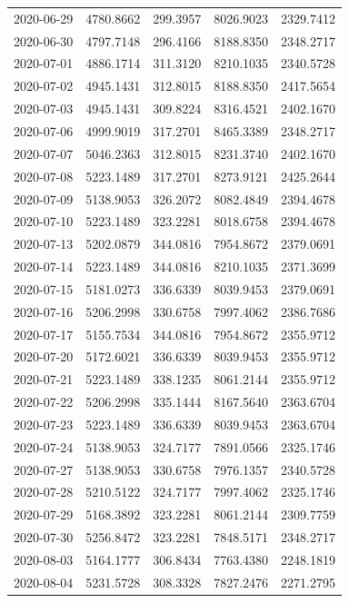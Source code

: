 \begin{footnotesize}
\begin{longtable}{lllll}
2020-06-29 & 4780.8662 & 299.3957 & 8026.9023 & 2329.7412 \\
2020-06-30 & 4797.7148 & 296.4166 & 8188.8350 & 2348.2717 \\
2020-07-01 & 4886.1714 & 311.3120 & 8210.1035 & 2340.5728 \\
2020-07-02 & 4945.1431 & 312.8015 & 8188.8350 & 2417.5654 \\
2020-07-03 & 4945.1431 & 309.8224 & 8316.4521 & 2402.1670 \\
2020-07-06 & 4999.9019 & 317.2701 & 8465.3389 & 2348.2717 \\
2020-07-07 & 5046.2363 & 312.8015 & 8231.3740 & 2402.1670 \\
2020-07-08 & 5223.1489 & 317.2701 & 8273.9121 & 2425.2644 \\
2020-07-09 & 5138.9053 & 326.2072 & 8082.4849 & 2394.4678 \\
2020-07-10 & 5223.1489 & 323.2281 & 8018.6758 & 2394.4678 \\
2020-07-13 & 5202.0879 & 344.0816 & 7954.8672 & 2379.0691 \\
2020-07-14 & 5223.1489 & 344.0816 & 8210.1035 & 2371.3699 \\
2020-07-15 & 5181.0273 & 336.6339 & 8039.9453 & 2379.0691 \\
2020-07-16 & 5206.2998 & 330.6758 & 7997.4062 & 2386.7686 \\
2020-07-17 & 5155.7534 & 344.0816 & 7954.8672 & 2355.9712 \\
2020-07-20 & 5172.6021 & 336.6339 & 8039.9453 & 2355.9712 \\
2020-07-21 & 5223.1489 & 338.1235 & 8061.2144 & 2355.9712 \\
2020-07-22 & 5206.2998 & 335.1444 & 8167.5640 & 2363.6704 \\
2020-07-23 & 5223.1489 & 336.6339 & 8039.9453 & 2363.6704 \\
2020-07-24 & 5138.9053 & 324.7177 & 7891.0566 & 2325.1746 \\
2020-07-27 & 5138.9053 & 330.6758 & 7976.1357 & 2340.5728 \\
2020-07-28 & 5210.5122 & 324.7177 & 7997.4062 & 2325.1746 \\
2020-07-29 & 5168.3892 & 323.2281 & 8061.2144 & 2309.7759 \\
2020-07-30 & 5256.8472 & 323.2281 & 7848.5171 & 2348.2717 \\
2020-08-03 & 5164.1777 & 306.8434 & 7763.4380 & 2248.1819 \\
2020-08-04 & 5231.5728 & 308.3328 & 7827.2476 & 2271.2795 \\

\end{longtable}
\end{footnotesize}
